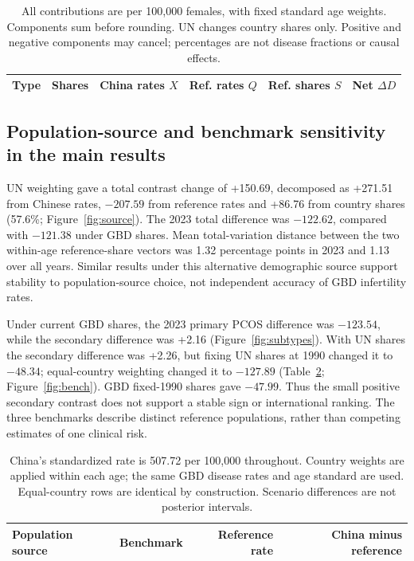 \documentclass[11pt,a4paper]{article}
\begin{document}
\begin{table}[htbp]\centering\small{}
\caption{Symmetric PCOS contrast-change decomposition, 1990--2023, by population source.}\label{tab:decomp}
\setlength{\tabcolsep}{4pt}
\begin{tabular}{llrrrr}\toprule
Type & Shares & China rates $X$ & Ref. rates $Q$ & Ref. shares $S$ & Net $\Delta D$\\\midrule
\end{tabular}
\caption*{All contributions are per 100,000 females, with fixed standard age weights. Components sum before rounding. UN changes country shares only. Positive and negative components may cancel; percentages are not disease fractions or causal effects.}
\end{table}

\subsection{Population-source and benchmark sensitivity in the main results}
UN weighting gave a total contrast change of +150.69, decomposed as +271.51 from Chinese rates, $-207.59$ from reference rates and +86.76 from country shares (57.6\%; Figure~\ref{fig:source}). The 2023 total difference was $-122.62$, compared with $-121.38$ under GBD shares. Mean total-variation distance between the two within-age reference-share vectors was 1.32 percentage points in 2023 and 1.13 over all years. Similar results under this alternative demographic source support stability to population-source choice, not independent accuracy of GBD infertility rates.

Under current GBD shares, the 2023 primary PCOS difference was $-123.54$, while the secondary difference was +2.16 (Figure~\ref{fig:subtypes}). With UN shares the secondary difference was +2.26, but fixing UN shares at 1990 changed it to $-48.34$; equal-country weighting changed it to $-127.89$ (Table~\ref{tab:bench}; Figure~\ref{fig:bench}). GBD fixed-1990 shares gave $-47.99$. Thus the small positive secondary contrast does not support a stable sign or international ranking. The three benchmarks describe distinct reference populations, rather than competing estimates of one clinical risk.

\begin{table}[htbp]\centering\small{}
\caption{Benchmark definition changes the 2023 PCOS secondary infertility contrast.}\label{tab:bench}
\begin{tabular}{llrr}\toprule
Population source & Benchmark & Reference rate & China minus reference\\\midrule
\end{tabular}
\caption*{China's standardized rate is 507.72 per 100,000 throughout. Country weights are applied within each age; the same GBD disease rates and age standard are used. Equal-country rows are identical by construction. Scenario differences are not posterior intervals.}
\end{table}
\end{document}
